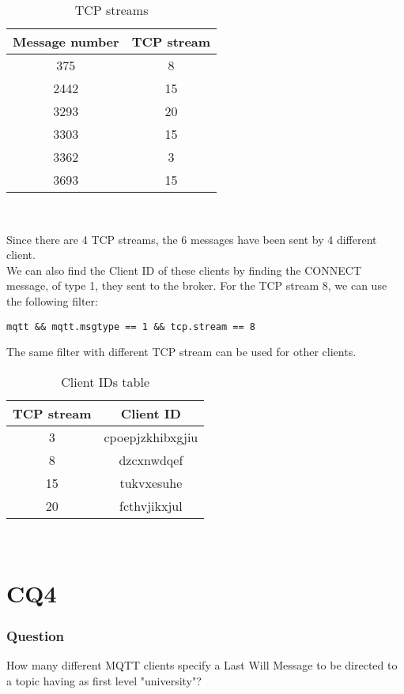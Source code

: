 \begin{table}[H]
\centering 
\begin{tabular}{| c | c |}
	\hline 
	\rowcolor{bluepoli!40}
	\textbf{Message number} & \textbf{TCP stream}\T\B \\
	\hline 
	375 & 8 \T\B\\
	2442 & 15 \T\B\\
	3293 & 20 \T\B\\
	3303 & 15 \T\B\\
	3362 & 3 \T\B\\
	3693  & 15 \T\B\\
	\hline
\end{tabular}
\\[10pt]
\caption{TCP streams}
\label{table:tcp_streams}
\end{table}

Since there are 4 TCP streams, the 6 messages have been sent by 4 different client.	\\
We can also find the Client ID of these clients by finding the CONNECT message, of type 1, they sent to the broker. For the TCP stream 8, we can use the following filter:
\begin{verbatim}
mqtt && mqtt.msgtype == 1 && tcp.stream == 8
\end{verbatim}
The same filter with different TCP stream can be used for other clients.

\begin{table}[H]
\centering 
\begin{tabular}{| c | c |}
	\hline 
	\rowcolor{bluepoli!40}
	\textbf{TCP stream} & \textbf{Client ID}\T\B \\
	\hline 
	3 & cpoepjzkhibxgjiu \T\B\\
	8 & dzcxnwdqef \T\B\\
	15 & tukvxesuhe \T\B\\
	20 & fcthvjikxjul \T\B\\
	\hline
\end{tabular}
\\[10pt]
\caption{Client IDs table}
\label{table:client_ids_table}
\end{table}

\section{CQ4}
\subsubsection{Question}
How many different MQTT clients specify a Last Will Message to be directed to a topic having as first level "university"?

